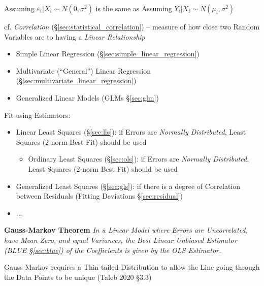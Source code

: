 Assuming $\varepsilon_i | X_i \sim N(0, \sigma^2)$ is the same as Assuming
$Y_i | X_i \sim N(\mu_i, \sigma^2)$

cf. \emph{Correlation} (\S\ref{sec:statistical_correlation}) -- measure of how
close two Random Variables are to having a \emph{Linear Relationship}

\begin{itemize}
  \item Simple Linear Regression (\S\ref{sec:simple_linear_regression})
  \item Multivariate (``General'') Linear Regression
    (\S\ref{sec:multivariate_linear_regression})
  \item Generalized Linear Models (GLMs \S\ref{sec:glm})
\end{itemize}

Fit using Estimators:
\begin{itemize}
  \item Linear Least Squares (\S\ref{sec:lls}): if Errors are
    \emph{Normally Distributed}, Least Squares ($2$-norm Best Fit) should be
    used
    \begin{itemize}
      \item Ordinary Least Squares (\S\ref{sec:ols}): if Errors are
        \emph{Normally Distributed}, Least Squares ($2$-norm Best Fit) should be
        used
    \end{itemize}
  \item Generalized Least Squares (\S\ref{sec:gls}): if
    there is a degree of Correlation between Residuals (Fitting Deviations
    \S\ref{sec:residual})
  \item ...
\end{itemize}

\textbf{Gauss-Markov Theorem} \emph{
  In a Linear Model where Errors are Uncorrelated, have Mean Zero, and equal
  Variances, the Best Linear Unbiased Estimator (BLUE \S\ref{sec:blue}) of the
  Coefficients is given by the OLS Estimator.
}

Gauss-Markov requires a Thin-tailed Distribution to allow the Line going
through the Data Points to be unique (Taleb 2020 \S 3.3)

